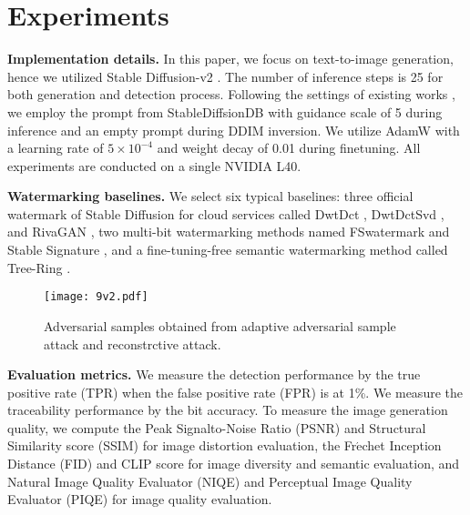 




\section{Experiments}

\noindent\textbf{Implementation details.} In this paper, we focus on text-to-image generation, hence we utilized Stable Diffusion-v2 \cite{rombach2022high}. The number of inference steps is 25 for both generation and detection process. Following the settings of existing works \cite{wen2024tree}, we employ
the prompt from StableDiffsionDB \cite{wang2022diffusiondb} with guidance
scale of 5 during inference and an empty prompt during DDIM inversion. 
We utilize AdamW with a learning rate of $5 \times 10^{-4}$ and weight decay of 0.01 during finetuning. All experiments are conducted on a single NVIDIA L40.





\noindent\textbf{Watermarking baselines.} We select six typical baselines: three official watermark of Stable Diffusion \cite{rombach2022high} for cloud services called DwtDct \cite{cox2007digital}, DwtDctSvd \cite{cox2007digital}, and RivaGAN \cite{zhang2019robust}, two multi-bit watermarking methods named FSwatermark \cite{xiong2023flexible} and Stable Signature \cite{fernandez2023stable}, and a fine-tuning-free semantic watermarking method called Tree-Ring \cite{wen2024tree}.


\begin{figure*}[t]
\centering
\texttt{[image: 9v2.pdf]} %
\caption{Adversarial samples obtained from adaptive adversarial sample attack and reconstrctive attack. }
\label{fig6}
\end{figure*}



\noindent\textbf{Evaluation metrics.} We measure the detection performance by the true positive rate (TPR) when the false
positive rate (FPR) is at 1\%. We measure the traceability performance by the bit accuracy. To measure the image generation quality, 
we compute the Peak Signalto-Noise Ratio (PSNR) \cite{hore2010image} and  Structural Similarity score (SSIM) \cite{wang2004image} for image distortion evaluation, the Fr$\acute{\text{e}}$chet Inception Distance (FID) \cite{heusel2017gans} and CLIP score \cite{Radford2021LearningTV} for image diversity and semantic evaluation, and Natural Image Quality Evaluator (NIQE) \cite{mittal2012making} and Perceptual Image Quality Evaluator (PIQE) \cite{venkatanath2015blind} for image quality evaluation. 



